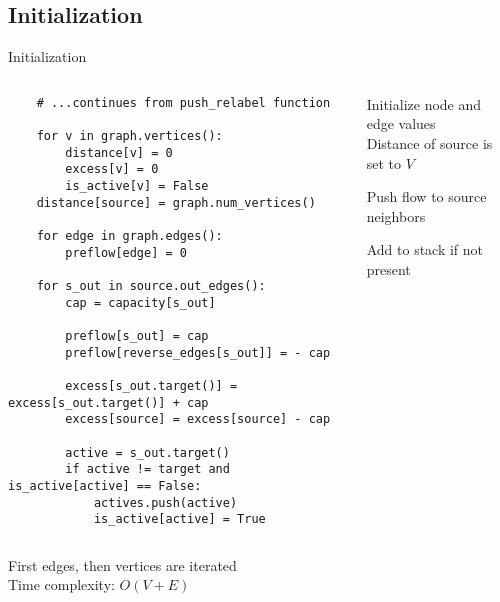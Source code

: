 \documentclass{beamer}
\begin{document}
\subsection{Initialization}
\begin{frame}[fragile]{Initialization}
    \begin{columns}[T]
        \begin{column}{0.55\textwidth}
            \begin{lstlisting}
    # ...continues from push_relabel function

    for v in graph.vertices():
        distance[v] = 0
        excess[v] = 0
        is_active[v] = False
    distance[source] = graph.num_vertices()

    for edge in graph.edges():
        preflow[edge] = 0

    for s_out in source.out_edges():
        cap = capacity[s_out]

        preflow[s_out] = cap
        preflow[reverse_edges[s_out]] = - cap

        excess[s_out.target()] = excess[s_out.target()] + cap
        excess[source] = excess[source] - cap

        active = s_out.target()
        if active != target and is_active[active] == False:
            actives.push(active)
            is_active[active] = True
            \end{lstlisting}
        \end{column}

        \begin{column}{0.45\textwidth}
            \begin{sidecomment}
                \pause
                \vskip 53bp
                Initialize node and edge values
                \\Distance of source is set to $V$

                \pause
                \vskip 22bp
                Push flow to source neighbors

                \pause
                \vskip 53bp
                Add to stack if not present
            \end{sidecomment}
        \end{column}
    \end{columns}

    \pause
    \vspace*{\fill}
    First edges, then vertices are iterated
    \\Time complexity: $O(V+E)$
\end{frame}
\end{document}
